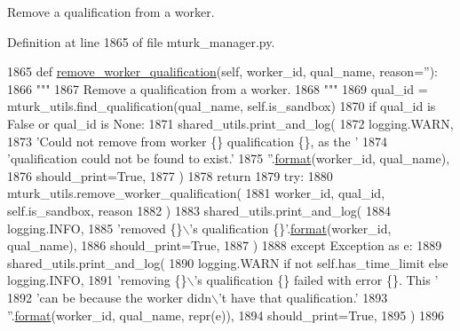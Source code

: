 \begin{DoxyVerb}Remove a qualification from a worker.
\end{DoxyVerb}
 

Definition at line 1865 of file mturk\+\_\+manager.\+py.


\begin{DoxyCode}
1865     \textcolor{keyword}{def }\hyperlink{namespaceparlai_1_1mturk_1_1core_1_1dev_1_1mturk__utils_abc2c057b91641179f7c4bb50dd916488}{remove\_worker\_qualification}(self, worker\_id, qual\_name, reason=''):
1866         \textcolor{stringliteral}{"""}
1867 \textcolor{stringliteral}{        Remove a qualification from a worker.}
1868 \textcolor{stringliteral}{        """}
1869         qual\_id = mturk\_utils.find\_qualification(qual\_name, self.is\_sandbox)
1870         \textcolor{keywordflow}{if} qual\_id \textcolor{keywordflow}{is} \textcolor{keyword}{False} \textcolor{keywordflow}{or} qual\_id \textcolor{keywordflow}{is} \textcolor{keywordtype}{None}:
1871             shared\_utils.print\_and\_log(
1872                 logging.WARN,
1873                 \textcolor{stringliteral}{'Could not remove from worker \{\} qualification \{\}, as the '}
1874                 \textcolor{stringliteral}{'qualification could not be found to exist.'}
1875                 \textcolor{stringliteral}{''}.\hyperlink{namespaceparlai_1_1chat__service_1_1services_1_1messenger_1_1shared__utils_a32e2e2022b824fbaf80c747160b52a76}{format}(worker\_id, qual\_name),
1876                 should\_print=\textcolor{keyword}{True},
1877             )
1878             \textcolor{keywordflow}{return}
1879         \textcolor{keywordflow}{try}:
1880             mturk\_utils.remove\_worker\_qualification(
1881                 worker\_id, qual\_id, self.is\_sandbox, reason
1882             )
1883             shared\_utils.print\_and\_log(
1884                 logging.INFO,
1885                 \textcolor{stringliteral}{'removed \{\}\(\backslash\)'s qualification \{\}'}.\hyperlink{namespaceparlai_1_1chat__service_1_1services_1_1messenger_1_1shared__utils_a32e2e2022b824fbaf80c747160b52a76}{format}(worker\_id, qual\_name),
1886                 should\_print=\textcolor{keyword}{True},
1887             )
1888         \textcolor{keywordflow}{except} Exception \textcolor{keyword}{as} e:
1889             shared\_utils.print\_and\_log(
1890                 logging.WARN \textcolor{keywordflow}{if} \textcolor{keywordflow}{not} self.has\_time\_limit \textcolor{keywordflow}{else} logging.INFO,
1891                 \textcolor{stringliteral}{'removing \{\}\(\backslash\)'s qualification \{\} failed with error \{\}. This '}
1892                 \textcolor{stringliteral}{'can be because the worker didn\(\backslash\)'t have that qualification.'}
1893                 \textcolor{stringliteral}{''}.\hyperlink{namespaceparlai_1_1chat__service_1_1services_1_1messenger_1_1shared__utils_a32e2e2022b824fbaf80c747160b52a76}{format}(worker\_id, qual\_name, repr(e)),
1894                 should\_print=\textcolor{keyword}{True},
1895             )
1896 
\end{DoxyCode}
